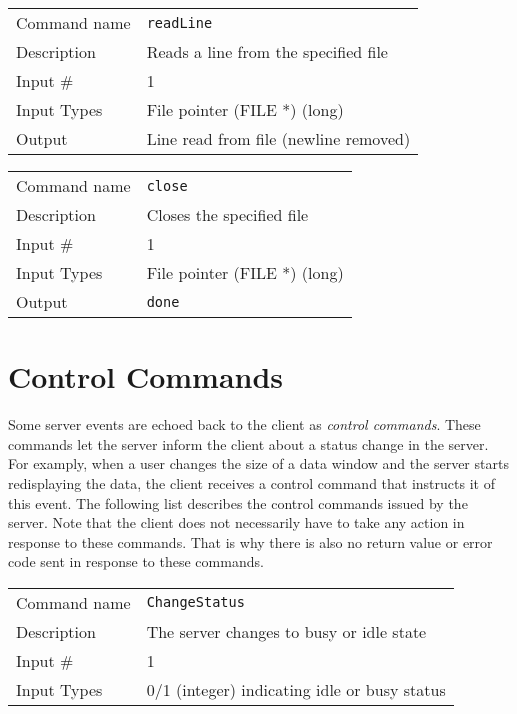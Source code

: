 \bigskip

\noindent
\begin{tabular}{l|p{5in}}
\hline
Command name & {\tt readLine} \\
Description  & Reads a line from the specified file \\
Input \#     & 1 \\
Input Types  & File pointer (FILE *) (long) \\
Output       & Line read from file (newline removed) \\
\hline
\end{tabular}

\bigskip

\noindent
\begin{tabular}{l|p{5in}}
\hline
Command name & {\tt close} \\
Description  & Closes the specified file \\
Input \#     & 1 \\
Input Types  & File pointer (FILE *) (long) \\
Output       & {\tt done} \\
\hline
\end{tabular}

\section{Control Commands}

Some server events are echoed back to the client as {\em control
commands}. These commands let the server inform the client about a
status change in the server.  For examply, when a user changes the
size of a data window and the server starts redisplaying the data, the
client receives a control command that instructs it of this event. The
following list describes the control commands issued by the
server. Note that the client does not necessarily have to take any
action in response to these commands. That is why there is also no
return value or error code sent in response to these commands.

\bigskip

\noindent
\begin{tabular}{l|p{5in}}
\hline
Command name & {\tt ChangeStatus} \\
Description  & The server changes to busy or idle state \\
Input \#     & 1 \\
Input Types  & 0/1 (integer) indicating idle or busy status \\
\hline
\end{tabular}

